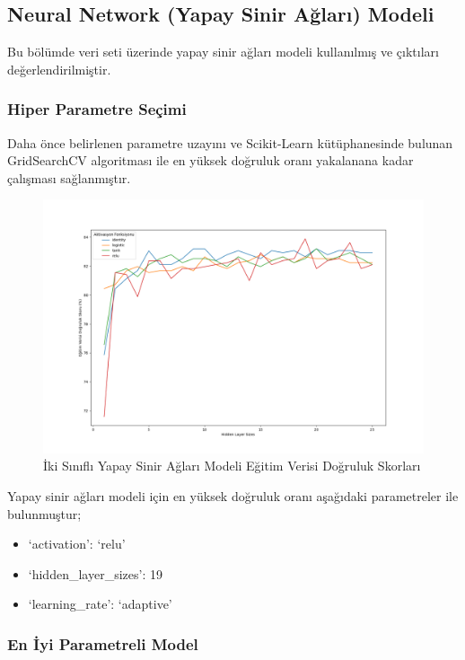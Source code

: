 \documentclass[12pt,twoside]{deuthesis}
\providecommand{\tightlist}{%
  \setlength{\itemsep}{0pt}\setlength{\parskip}{0pt}}
\begin{document}
\hypertarget{bin_nn}{%
\subsection{Neural Network (Yapay Sinir Ağları) Modeli}\label{bin_nn}}

Bu bölümde veri seti üzerinde yapay sinir ağları modeli kullanılmış ve çıktıları değerlendirilmiştir.

\hypertarget{hiper-parametre-seuxe7imi-7}{%
\subsubsection{Hiper Parametre Seçimi}\label{hiper-parametre-seuxe7imi-7}}

Daha önce belirlenen parametre uzayını ve Scikit-Learn kütüphanesinde bulunan GridSearchCV algoritması ile en yüksek doğruluk oranı yakalanana kadar çalışması sağlanmıştır.
\begin{figure}

{\centering \includegraphics[width=1.1\linewidth,height=0.55\textheight]{figure/NN_bin_Grid_Graph} 

}

\caption{İki Sınıflı Yapay Sinir Ağları Modeli Eğitim Verisi Doğruluk Skorları}\label{fig:unnamed-chunk-76}
\end{figure}
Yapay sinir ağları modeli için en yüksek doğruluk oranı aşağıdaki parametreler ile bulunmuştur;
\begin{itemize}
\tightlist
\item
  `activation': `relu'\\
\item
  `hidden\_layer\_sizes': 19\\
\item
  `learning\_rate': `adaptive'\\
  \newpage  
\end{itemize}
\hypertarget{en-iyi-parametreli-model-5}{%
\subsubsection{En İyi Parametreli Model}\label{en-iyi-parametreli-model-5}}
\end{document}
